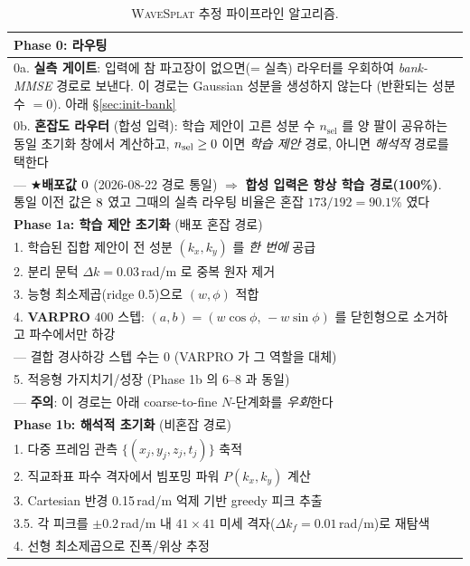 \documentclass[11pt]{report}
\numberwithin{equation}{chapter}
\numberwithin{figure}{chapter}
\numberwithin{table}{chapter}
\newcommand{\WS}{\textsc{WaveSplat}}
\begin{document}
\begin{table}[htbp]
\centering
\caption{\WS{} 추정 파이프라인 알고리즘.}
\label{alg:pipeline}
\begin{tabular}{p{}}
\toprule
\textbf{Phase 0: 라우팅} \\
\midrule
0a. \textbf{실측 게이트}: 입력에 참 파고장이 없으면(= 실측) 라우터를 우회하여
    \emph{bank-MMSE} 경로로 보낸다. 이 경로는 Gaussian 성분을 생성하지 않는다
    (반환되는 성분 수 $=0$). 아래 §\ref{sec:init-bank} \\
0b. \textbf{혼잡도 라우터} (합성 입력): 학습 제안이 고른 성분 수 $n_\text{sel}$ 를
    양 팔이 공유하는 동일 초기화 창에서 계산하고, $n_\text{sel} \ge 0$ 이면
    \emph{학습 제안} 경로, 아니면 \emph{해석적} 경로를 택한다 \\
\quad --- ★\textbf{배포값 $0$} (2026-08-22 경로 통일) $\Rightarrow$
      \textbf{합성 입력은 항상 학습 경로(100\%)}. 통일 이전 값은 $8$
      였고 그때의 실측 라우팅 비율은 혼잡 $173/192 = 90.1\%$ 였다 \\
\midrule
\textbf{Phase 1a: 학습 제안 초기화} (배포 혼잡 경로) \\
\midrule
1. 학습된 집합 제안이 전 성분 $(k_x, k_y)$ 를 \emph{한 번에} 공급 \\
2. 분리 문턱 $\Delta k = 0.03$\,rad/m 로 중복 원자 제거 \\
3. 능형 최소제곱(ridge 0.5)으로 $(w, \phi)$ 적합 \\
4. \textbf{VARPRO} $400$ 스텝: $(a,b) = (w\cos\phi,\, -w\sin\phi)$ 를 닫힌형으로
   소거하고 파수에서만 하강 \\
\quad --- 결합 경사하강 스텝 수는 $0$ (VARPRO 가 그 역할을 대체) \\
5. 적응형 가지치기/성장 (Phase 1b 의 6--8 과 동일) \\
\quad --- \textbf{주의}: 이 경로는 아래 coarse-to-fine $N$-단계화를 \emph{우회}한다 \\
\midrule
\textbf{Phase 1b: 해석적 초기화} (비혼잡 경로) \\
\midrule
1. 다중 프레임 관측 $\{(x_j, y_j, z_j, t_j)\}$ 축적 \\
2. 직교좌표 파수 격자에서 빔포밍 파워 $P(k_x, k_y)$ 계산 \\
3. Cartesian 반경 0.15\,rad/m 억제 기반 greedy 피크 추출 \\
3.5. 각 피크를 $\pm0.2$\,rad/m 내 $41\times41$ 미세 격자($\Delta k_f=0.01$\,rad/m)로 재탐색 \\
4. 선형 최소제곱으로 진폭/위상 추정 \\

\end{tabular}
\end{table}
\end{document}
